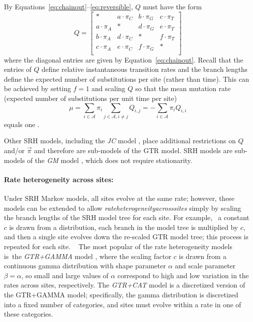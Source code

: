 By Equations~\ref{eq:chainout}--\ref{eq:reversible}, $Q$ must have the form
\begin{equation}
	Q = 
	\begin{bmatrix}
		* &  a \cdot \pi_C  & b \cdot \pi_G & c \cdot \pi_T\\
		a \cdot \pi_A & * & d \cdot \pi_G & e \cdot \pi_T \\
		b \cdot \pi_A & d \cdot \pi_C  & * & f \cdot \pi_T \\
		c \cdot \pi_A & e \cdot \pi_C  & f \cdot \pi_G & * \\
	\end{bmatrix}
\end{equation}
where the diagonal entries are given by Equation~\ref{eq:chainout}.
Recall that the entries of $Q$ define relative instantaneous transition rates and the branch lengths define the expected number of substitutions per site (rather than time).
This can be achieved by setting $f = 1$ and scaling $Q$ so that the mean mutation rate (expected number of substitutions per unit time per site)
\begin{equation}
	\mu = \sum_{i \in \mathcal{A}} \pi_i \sum_{j \in \mathcal{A}, i \ne j} Q_{i,j} = - \sum_{i \in \mathcal{A}} \pi_i Q_{i,i}
\end{equation}
equals one \cite{yang2006computational}.

Other SRH models, including the \textit{\gls{JC}} model \cite{jukes1969evolution}, place additional restrictions on $Q$ and/or $\vec{\pi}$ and therefore are sub-models of the GTR model.
SRH models are sub-models of the \textit{\gls{GM}} model \cite{steel1994recovering2}, which does not require stationarity.

\paragraph{Rate heterogeneity across sites:} 
Under SRH Markov models, all sites evolve at the same rate; however, these models can be extended to allow \textit{\gls{rateheterogeneityacrosssites}} simply by scaling the branch lengths of the SRH model tree for each site. 
For example,  a constant $c$ is drawn from a distribution, each branch in the model tree is multiplied by $c$, and then a single site evolves down the re-scaled GTR model tree; this process is repeated for each site.  
The most popular of the rate heterogeneity models is the \textit{\gls{GTR+GAMMA}}  model \cite{yang1994maximum, yang1996among}, where the scaling factor $c$ is drawn from a continuous gamma distribution with shape parameter $\alpha$ and scale parameter $\beta = \alpha$, so small and large values of $\alpha$ correspond to high and low variation in the rates across sites, respectively.
The \textit{\gls{GTR+CAT}} model \cite{yang1994maximum} is a discretized version of the GTR+GAMMA model; specifically, the gamma distribution is discretized into a fixed number of categories, and sites must evolve within a rate in one of these categories.

